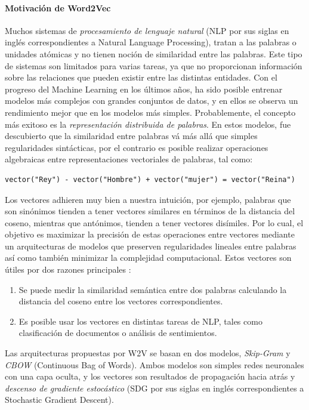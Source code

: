 \paragraph{Motivación de Word2Vec}
Muchos sistemas de \textit{procesamiento de lenguaje natural} (NLP por sus siglas en inglés correspondientes a Natural Language Processing), tratan a las palabras o unidades atómicas y no tienen noción de similaridad entre las palabras. Este tipo de sistemas son limitados para varias tareas, ya que no proporcionan información sobre las relaciones que pueden existir entre las distintas entidades. Con el progreso del Machine Learning en los últimos años, ha sido posible entrenar modelos más complejos con grandes conjuntos de datos, y en ellos se observa un rendimiento mejor que en los modelos más simples. Probablemente, el concepto más exitoso es la \textit{representación distribuida de palabras}. En estos modelos, fue descubierto que la similaridad entre palabras vá más allá que simples regularidades sintácticas, por el contrario es posible realizar operaciones algebraicas entre representaciones vectoriales de palabras, tal como:

\begin{verbatim}
vector("Rey") - vector("Hombre") + vector("mujer") = vector("Reina")
\end{verbatim}

Los vectores adhieren muy bien a nuestra intuición, por ejemplo, palabras que son sinónimos tienden a tener vectores similares en términos de la distancia del coseno, mientras que antónimos, tienden a tener vectores disímiles. Por lo cual, el objetivo es maximizar la precisión de estas operaciones entre vectores mediante un arquitecturas de modelos que preserven regularidades lineales entre palabras así como también minimizar la complejidad computacional. Estos vectores son útiles por dos razones principales \citep{mccormick2016word2vec}:

\begin{enumerate}
	\item Se puede medir la similaridad semántica entre dos palabras calculando la distancia del coseno entre los vectores correspondientes.
	\item Es posible usar los vectores en distintas tareas de NLP, tales como clasificación de documentos o análisis de sentimientos.
\end{enumerate}

\bigskip Las arquitecturas propuestas por W2V se basan en dos modelos, \textit{Skip-Gram} y \textit{CBOW} (Continuous Bag of Words). Ambos modelos son simples redes neuronales con una capa oculta, y los vectores son resultados de propagación hacia atrás y \textit{descenso de gradiente estocástico} (SDG por sus siglas en inglés correspondientes a Stochastic Gradient Descent).


